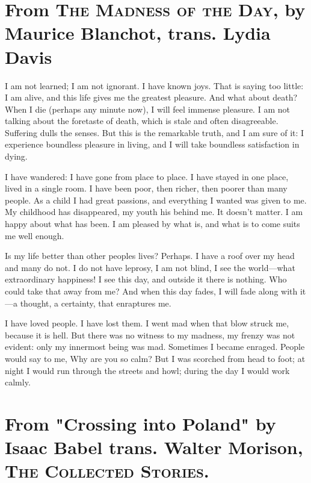 \documentclass[
]{memoir}
\begin{document}
\hypertarget{from-the-madness-of-the-day-by-maurice-blanchot-trans.-lydia-davis}{%
\section*{\texorpdfstring{From \textsc{The Madness of the Day}, by
Maurice Blanchot, trans. Lydia
Davis}{From The Madness of the Day, by Maurice Blanchot, trans. Lydia Davis}}\label{from-the-madness-of-the-day-by-maurice-blanchot-trans.-lydia-davis}}

I am not learned; I am not ignorant. I have known joys. That is saying
too little: I am alive, and this life gives me the greatest pleasure.
And what about death? When I die (perhaps any minute now), I will feel
immense pleasure. I am not talking about the foretaste of death, which
is stale and often disagreeable. Suffering dulls the senses. But this is
the remarkable truth, and I am sure of it: I experience boundless
pleasure in living, and I will take boundless satisfaction in dying.

I have wandered: I have gone from place to place. I have stayed in one
place, lived in a single room. I have been poor, then richer, then
poorer than many people. As a child I had great passions, and everything
I wanted was given to me. My childhood has disappeared, my youth his
behind me. It doesn't matter. I am happy about what has been. I am
pleased by what is, and what is to come suits me well enough.

Is my life better than other peoples lives? Perhaps. I have a roof over
my head and many do not. I do not have leprosy, I am not blind, I see
the world---what extraordinary happiness! I see this day, and outside it
there is nothing. Who could take that away from me? And when this day
fades, I will fade along with it---a thought, a certainty, that
enraptures me.

I have loved people. I have lost them. I went mad when that blow struck
me, because it is hell. But there was no witness to my madness, my
frenzy was not evident: only my innermost being was mad. Sometimes I
became enraged. People would say to me, Why are you so calm? But I was
scorched from head to foot; at night I would run through the streets and
howl; during the day I would work calmly.

\hypertarget{from-crossing-into-poland-by-isaac-babel-trans.-walter-morison-the-collected-stories.}{%
\section*{\texorpdfstring{From "Crossing into Poland" by Isaac Babel
trans. Walter Morison, \textsc{The Collected
Stories}.}{From "Crossing into Poland" by Isaac Babel trans. Walter Morison, The Collected Stories.}}\label{from-crossing-into-poland-by-isaac-babel-trans.-walter-morison-the-collected-stories.}}
\end{document}

